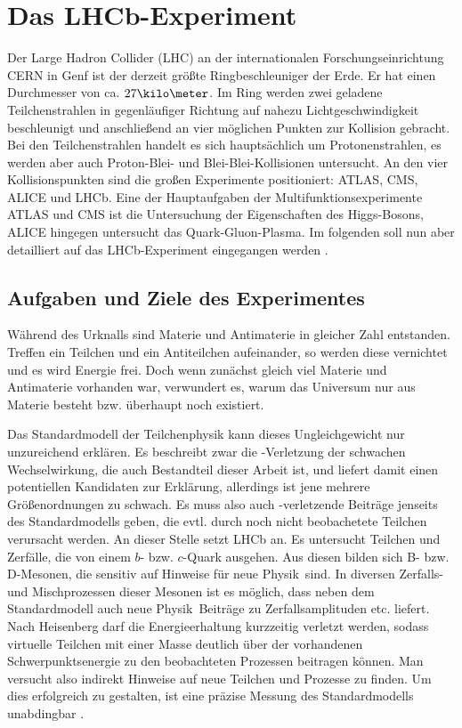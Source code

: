 \chapter{Das LHCb-Experiment}  \label{kap:experiment}
Der Large Hadron Collider (LHC) an der internationalen Forschungseinrichtung CERN in Genf ist der derzeit größte Ringbeschleuniger der Erde. Er hat einen Durchmesser von ca. $27\kilo\meter$. Im Ring werden zwei geladene Teilchenstrahlen in gegenläufiger Richtung auf nahezu Lichtgeschwindigkeit beschleunigt und anschließend an vier möglichen Punkten zur Kollision gebracht. Bei den Teilchenstrahlen handelt es sich hauptsächlich um Protonenstrahlen, es werden aber auch Proton-Blei- und Blei-Blei-Kollisionen untersucht. An den vier Kollisionspunkten sind die großen Experimente positioniert: ATLAS, CMS, ALICE und LHCb. Eine der Hauptaufgaben der Multifunktionsexperimente ATLAS und CMS ist die Untersuchung der Eigenschaften des Higgs-Bosons, ALICE hingegen untersucht das Quark-Gluon-Plasma. Im folgenden soll nun aber detailliert auf das LHCb-Experiment eingegangen werden \cite{lhc-info}.

\section{Aufgaben und Ziele des Experimentes}
Während des Urknalls sind Materie und Antimaterie in gleicher Zahl entstanden. Treffen ein Teilchen und ein Antiteilchen aufeinander, so werden diese vernichtet und es wird Energie frei. Doch wenn zunächst gleich viel Materie und Antimaterie vorhanden war, verwundert es, warum das Universum nur aus Materie besteht bzw. überhaupt noch existiert.

Das Standardmodell der Teilchenphysik kann dieses Ungleichgewicht nur unzureichend erklären. Es beschreibt zwar die \CP-Verletzung der schwachen Wechselwirkung, die auch Bestandteil dieser Arbeit ist, und liefert damit einen potentiellen Kandidaten zur Erklärung, allerdings ist jene mehrere Größenordnungen zu schwach. Es muss also auch \CP-verletzende Beiträge jenseits des Standardmodells geben, die evtl. durch noch nicht beobachetete Teilchen verursacht werden. An dieser Stelle setzt LHCb an. Es untersucht Teilchen und Zerfälle, die von einem $b$- bzw. $c$-Quark ausgehen. Aus diesen bilden sich B- bzw. D-Mesonen, die sensitiv auf Hinweise für \glqq neue Physik\grqq\ sind. In diversen Zerfalls- und Mischprozessen dieser Mesonen ist es möglich, dass neben dem Standardmodell auch \glqq neue Physik\grqq\ Beiträge zu Zerfallsamplituden etc. liefert. Nach Heisenberg darf die Energieerhaltung kurzzeitig verletzt werden, sodass virtuelle Teilchen mit einer Masse deutlich über der vorhandenen Schwerpunktsenergie zu den beobachteten Prozessen beitragen können. Man versucht also indirekt Hinweise auf neue Teilchen und Prozesse zu finden. Um dies erfolgreich zu gestalten, ist eine präzise Messung des Standardmodells unabdingbar \cite{cern-courier, roadmap, lhcb-info}.

